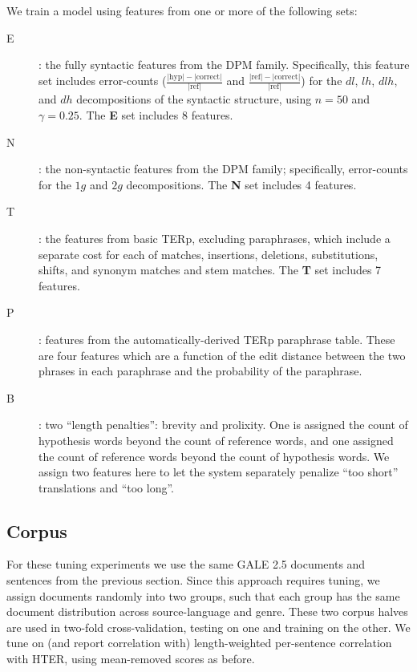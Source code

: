 \documentclass{kluwer}    %
\begin{document}
\begin{article}
We train a model using features from one or more of the following
sets:
\begin{description}
\item[E]: the fully syntactic features from the DPM family.
  Specifically, this feature set includes error-counts
  ($\frac{|\textrm{hyp}| - |\textrm{correct}|}{|\textrm{ref}|}$ and
  $\frac{|\textrm{ref}| - |\textrm{correct}|}{|\textrm{ref}|}$) 
  for the $dl$, $lh$, $dlh$, and $dh$ decompositions of the syntactic
  structure, using $n=50$ and $\gamma=0.25$.  The \textbf{E} set
  includes 8 features.
\item[N]: the non-syntactic features from the DPM family;
  specifically, error-counts for the $1g$ and $2g$ decompositions.
  The \textbf{N} set includes 4 features.
\item[T]: the features from basic TERp, excluding paraphrases, which include a separate cost
  for each of matches, insertions, deletions, substitutions, shifts, and
  synonym matches and stem matches. The \textbf{T} set includes 7 features.
\item[P]: features from the automatically-derived TERp paraphrase
  table. These are four features which are a function of the edit
  distance between the two phrases in each paraphrase and the
  probability of the paraphrase.
\item[B]: two ``length penalties'': brevity and prolixity. One is assigned the count of
  hypothesis words beyond the count of reference words, and one
  assigned the count of reference words beyond the count of hypothesis
  words.
  We assign two features here to let the system separately penalize
  ``too short'' translations and ``too long''.
\end{description}

\subsection{Corpus}

For these tuning experiments we use the same GALE 2.5 documents and
sentences from the previous section.  Since this approach requires
tuning, we assign documents randomly into two groups, such that each
group has the same document distribution across source-language and
genre.
%
These two corpus halves are used in two-fold cross-validation, testing
on one and training on the other.  We tune on (and report correlation
with) length-weighted per-sentence correlation with HTER, using
mean-removed scores as before.


\end{article}
\end{document}
